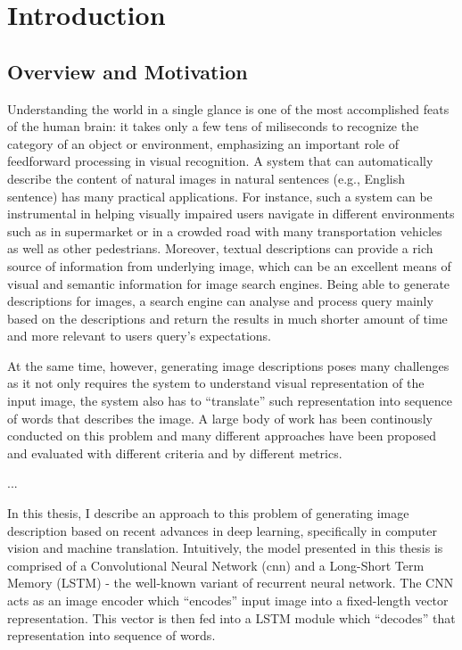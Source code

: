 \chapter{Introduction}

\section{Overview and Motivation}
Understanding the world in a single glance is one of the most accomplished feats of the human brain: it takes only a few tens of miliseconds to recognize the category of an object or environment, emphasizing an important role of feedforward processing in visual recognition.
A system that can automatically describe the content of natural images in natural sentences (e.g., English sentence) has many practical applications. For instance, such a system can be instrumental in helping visually impaired users navigate in different environments such as in supermarket or in a crowded road with many transportation vehicles as well as other pedestrians. Moreover, textual descriptions can provide a rich source of information from underlying image, which can be an excellent means of visual and semantic information for image search engines. Being able to generate descriptions for images, a search engine can analyse and process query mainly based on the descriptions and return the results in much shorter amount of time and more relevant to users query's expectations.

At the same time, however, generating image descriptions poses many challenges as it not only requires the system to understand visual representation of the input image, the system also has to ``translate'' such representation into sequence of words that describes the image. A large body of work has been continously conducted on this problem and many different approaches have been proposed and evaluated with different criteria and by different metrics.

...

In this thesis, I describe an approach to this problem of generating image description based on recent advances in deep learning, specifically in computer vision and machine translation. Intuitively, the model presented in this thesis is comprised of a Convolutional Neural Network (\gls{cnn}) and a Long-Short Term Memory (LSTM) - the well-known variant of recurrent neural network. The CNN acts as an image encoder which ``encodes'' input image into a fixed-length vector representation. This vector is then fed into a LSTM module which ``decodes'' that representation into sequence of words.

